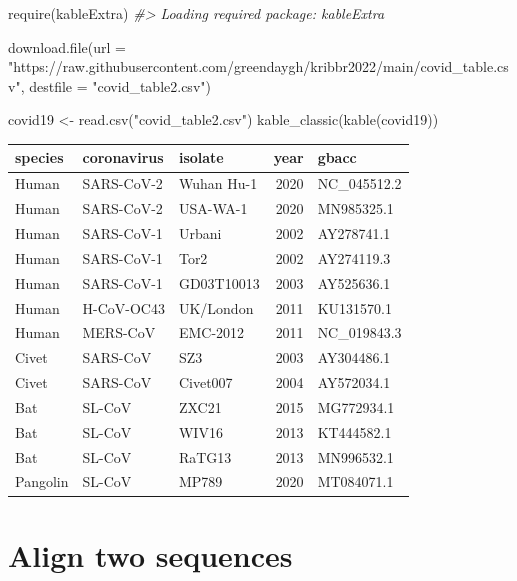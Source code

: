 \documentclass[
]{book}
\newenvironment{Shaded}{\begin{snugshade}}{\end{snugshade}}
\newcommand{\AttributeTok}[1]{\textcolor[rgb]{0.77,0.63,0.00}{#1}}
\newcommand{\CommentTok}[1]{\textcolor[rgb]{0.56,0.35,0.01}{\textit{#1}}}
\newcommand{\FunctionTok}[1]{\textcolor[rgb]{0.00,0.00,0.00}{#1}}
\newcommand{\NormalTok}[1]{#1}
\newcommand{\OtherTok}[1]{\textcolor[rgb]{0.56,0.35,0.01}{#1}}
\newcommand{\StringTok}[1]{\textcolor[rgb]{0.31,0.60,0.02}{#1}}
\begin{document}
\begin{Shaded}
\begin{Highlighting}[]
\FunctionTok{require}\NormalTok{(kableExtra)}
\CommentTok{\#\textgreater{} Loading required package: kableExtra}

\FunctionTok{download.file}\NormalTok{(}\AttributeTok{url =} \StringTok{"https://raw.githubusercontent.com/greendaygh/kribbr2022/main/covid\_table.csv"}\NormalTok{, }\AttributeTok{destfile =} \StringTok{"covid\_table2.csv"}\NormalTok{)}

\NormalTok{covid19 }\OtherTok{\textless{}{-}} \FunctionTok{read.csv}\NormalTok{(}\StringTok{"covid\_table2.csv"}\NormalTok{)}
\FunctionTok{kable\_classic}\NormalTok{(}\FunctionTok{kable}\NormalTok{(covid19))}
\end{Highlighting}
\end{Shaded}

\begin{table}
\centering
\begin{tabular}{l|l|l|r|l}
\hline
species & coronavirus & isolate & year & gbacc\\
\hline
Human & SARS-CoV-2 & Wuhan Hu-1 & 2020 & NC\_045512.2\\
\hline
Human & SARS-CoV-2 & USA-WA-1 & 2020 & MN985325.1\\
\hline
Human & SARS-CoV-1 & Urbani & 2002 & AY278741.1\\
\hline
Human & SARS-CoV-1 & Tor2 & 2002 & AY274119.3\\
\hline
Human & SARS-CoV-1 & GD03T10013 & 2003 & AY525636.1\\
\hline
Human & H-CoV-OC43 & UK/London & 2011 & KU131570.1\\
\hline
Human & MERS-CoV & EMC-2012 & 2011 & NC\_019843.3\\
\hline
Civet & SARS-CoV & SZ3 & 2003 & AY304486.1\\
\hline
Civet & SARS-CoV & Civet007 & 2004 & AY572034.1\\
\hline
Bat & SL-CoV & ZXC21 & 2015 & MG772934.1\\
\hline
Bat & SL-CoV & WIV16 & 2013 & KT444582.1\\
\hline
Bat & SL-CoV & RaTG13 & 2013 & MN996532.1\\
\hline
Pangolin & SL-CoV & MP789 & 2020 & MT084071.1\\
\hline
\end{tabular}
\end{table}

\hypertarget{align-two-sequences}{%
\section{Align two sequences}\label{align-two-sequences}}
\end{document}
